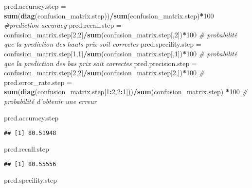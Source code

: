 \documentclass[
]{article}
\newenvironment{Shaded}{\begin{snugshade}}{\end{snugshade}}
\newcommand{\CommentTok}[1]{\textcolor[rgb]{0.56,0.35,0.01}{\textit{#1}}}
\newcommand{\DecValTok}[1]{\textcolor[rgb]{0.00,0.00,0.81}{#1}}
\newcommand{\KeywordTok}[1]{\textcolor[rgb]{0.13,0.29,0.53}{\textbf{#1}}}
\newcommand{\NormalTok}[1]{#1}
\newcommand{\OperatorTok}[1]{\textcolor[rgb]{0.81,0.36,0.00}{\textbf{#1}}}
\newcommand{\StringTok}[1]{\textcolor[rgb]{0.31,0.60,0.02}{#1}}
\begin{document}
\begin{Shaded}
\begin{Highlighting}[]
\NormalTok{pred.accuracy.step =}\StringTok{ }\KeywordTok{sum}\NormalTok{(}\KeywordTok{diag}\NormalTok{(confusion_matrix.step))}\OperatorTok{/}\KeywordTok{sum}\NormalTok{(confusion_matrix.step)}\OperatorTok{*}\DecValTok{100}
\CommentTok{#prediction accuracy}
\NormalTok{pred.recall.step =}\StringTok{ }\NormalTok{confusion_matrix.step[}\DecValTok{2}\NormalTok{,}\DecValTok{2}\NormalTok{]}\OperatorTok{/}\KeywordTok{sum}\NormalTok{(confusion_matrix.step[,}\DecValTok{2}\NormalTok{])}\OperatorTok{*}\DecValTok{100} 
\CommentTok{# probabilité que la prediction des hauts prix soit correctes }
\NormalTok{pred.specifity.step =}\StringTok{ }\NormalTok{confusion_matrix.step[}\DecValTok{1}\NormalTok{,}\DecValTok{1}\NormalTok{]}\OperatorTok{/}\KeywordTok{sum}\NormalTok{(confusion_matrix.step[,}\DecValTok{1}\NormalTok{])}\OperatorTok{*}\DecValTok{100} 
\CommentTok{# probabilité que la prediction des bas prix soit correctes }
\NormalTok{pred.precision.step =}\StringTok{ }\NormalTok{confusion_matrix.step[}\DecValTok{2}\NormalTok{,}\DecValTok{2}\NormalTok{]}\OperatorTok{/}\KeywordTok{sum}\NormalTok{(confusion_matrix.step[}\DecValTok{2}\NormalTok{,])}\OperatorTok{*}\DecValTok{100}
\CommentTok{# }
\NormalTok{pred.error_rate.step =}\StringTok{ }\KeywordTok{sum}\NormalTok{(}\KeywordTok{diag}\NormalTok{(confusion_matrix.step[}\DecValTok{1}\OperatorTok{:}\DecValTok{2}\NormalTok{,}\DecValTok{2}\OperatorTok{:}\DecValTok{1}\NormalTok{]))}\OperatorTok{/}\KeywordTok{sum}\NormalTok{(confusion_matrix.step) }\OperatorTok{*}\DecValTok{100} \CommentTok{# probabilité d'obtenir une erreur}

\NormalTok{pred.accuracy.step}
\end{Highlighting}
\end{Shaded}

\begin{verbatim}
## [1] 80.51948
\end{verbatim}

\begin{Shaded}
\begin{Highlighting}[]
\NormalTok{pred.recall.step}
\end{Highlighting}
\end{Shaded}

\begin{verbatim}
## [1] 80.55556
\end{verbatim}

\begin{Shaded}
\begin{Highlighting}[]
\NormalTok{pred.specifity.step}
\end{Highlighting}
\end{Shaded}
\end{document}
